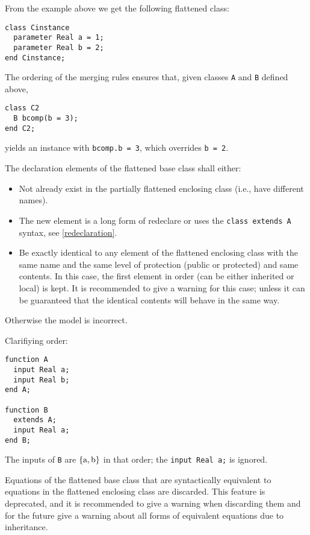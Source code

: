 \begin{nonnormative}
From the example above we get the following flattened class:
\begin{lstlisting}[language=modelica]
class Cinstance
  parameter Real a = 1;
  parameter Real b = 2;
end Cinstance;
\end{lstlisting}

The ordering of the merging rules ensures that, given classes \lstinline!A! and \lstinline!B! defined above,
\begin{lstlisting}[language=modelica]
class C2
  B bcomp(b = 3);
end C2;
\end{lstlisting}
yields an instance with \lstinline!bcomp.b = 3!, which overrides \lstinline!b = 2!.
\end{nonnormative}

The declaration elements of the flattened base class shall either:
\begin{itemize}
\item
  Not already exist in the partially flattened enclosing class (i.e., have different names).
\item
  The new element is a long form of redeclare or uses the \lstinline!class extends A! syntax, see \cref{redeclaration}.
\item
  Be exactly identical to any element of the flattened enclosing class with the same name and the same level of protection (public or protected) and same contents.
  In this case, the first element in order (can be either inherited or local) is kept.
  It is recommended to give a warning for this case; unless it can be guaranteed that the identical contents will behave in the same way.
\end{itemize}
Otherwise the model is incorrect.

\begin{nonnormative}
Clarifiying order:
\begin{lstlisting}[language=modelica]
function A
  input Real a;
  input Real b;
end A;

function B
  extends A;
  input Real a;
end B;
\end{lstlisting}
The inputs of \lstinline!B! are $\{\text{\lstinline!a!}, \text{\lstinline!b!}\}$ in that order; the \lstinline!input Real a;! is ignored.
\end{nonnormative}

Equations of the flattened base class that are syntactically equivalent to equations in the flattened enclosing class are discarded.
This feature is deprecated, and it is recommended to give a warning when discarding them and for the future give a warning about all forms of equivalent equations due to inheritance.

